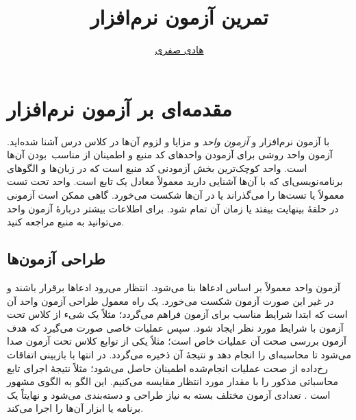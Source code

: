 \documentclass{utap}
\title{تمرین آزمون نرم‌افزار}
\author{\href{mailto:hadi.safari@ut.ac.ir?subject=[AP\%20S98 UT]\%20}{هادی صفری}}
\begin{document}
    \maketitle

    \section{مقدمه‌ای بر آزمون نرم‌افزار}

    با آزمون نرم‌افزار و \textit{آزمون واحد} و مزایا و لزوم آن‌ها در کلاس درس آشنا شده‌اید. آزمون واحد روشی  برای آزمودن واحدهای کد منبع و اطمینان از مناسب~بودن آن‌ها است. واحد کوچک‌ترین بخش آزمودنی کد منبع است که در زبان‌ها و الگوهای برنامه‌نویسی‌ای که با آن‌ها آشنایی دارید معمولاً معادل یک تابع است.
    واحد تحت تست معمولاً یا تست‌ها را می‌گذراند یا در آن‌ها شکست می‌خورد. گاهی ممکن است آزمونی در حلقهٔ بینهایت بیفتد یا زمان آن تمام شود.
    برای اطلاعات بیشتر دربارهٔ آزمون واحد می‌توانید به منبع \cite{wikibooks18} مراجعه کنید.

    \subsection{طراحی آزمون‌ها}

    آزمون واحد معمولاً بر اساس ادعاها بنا می‌شود. انتظار می‌رود ادعاها برقرار باشند و در غیر این صورت آزمون شکست می‌خورد.
    یک راه معمول طراحی آزمون واحد آن است که ابتدا شرایط مناسب برای آزمون فراهم می‌گردد؛ مثلاً یک شیء از کلاس تحت آزمون با شرایط مورد نظر ایجاد شود. سپس عملیات خاصی صورت می‌گیرد که هدف آزمون بررسی صحت آن عملیات خاص است؛ مثلاً یکی از توابع کلاس تحت آزمون صدا می‌شود تا محاسبه‌ای را انجام دهد و نتیجهٔ آن ذخیره می‌گردد. در انتها با بازبینی اتفاقات رخ‌داده از صحت عملیات انجام‌شده اطمینان حاصل می‌شود؛ مثلاً نتیجهٔ اجرای تابع محاسباتی مذکور را با مقدار مورد انتظار مقایسه می‌کنیم. این الگو به الگوی  مشهور است \cite{dietrich14,vocke18}. تعدادی آزمون مختلف بسته به نیاز طراحی و دسته‌بندی می‌شود و نهایتاً یک برنامه یا ابزار آن‌ها را اجرا می‌کند.
\end{document}
